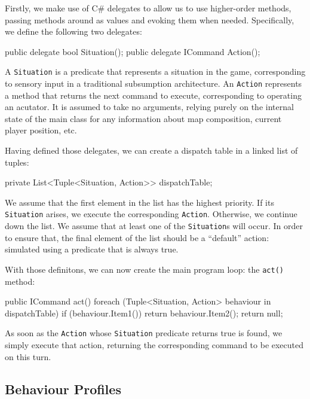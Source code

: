 \documentclass[11pt]{article}
\begin{document}
Firstly, we make use of C\# delegates to allow us to use higher-order methods, passing methods around as values and evoking them when needed. Specifically, we define the following two delegates:

\begin{code}
public delegate bool Situation();
public delegate ICommand Action();
\end{code}

A \verb|Situation| is a predicate that represents a situation in the game, corresponding to sensory input in a traditional subsumption architecture. An \verb|Action| represents a method that returns the next command to execute, corresponding to operating an acutator. It is assumed to take no arguments, relying purely on the internal state of the main class for any information about map composition, current player position, etc.

Having defined those delegates, we can create a dispatch table in a linked list of tuples:

\begin{code}
private List<Tuple<Situation, Action>> dispatchTable;
\end{code}

We assume that the first element in the list has the highest priority. If its \verb|Situation| arises, we execute the corresponding \verb|Action|. Otherwise, we continue down the list. We assume that at least one of the \verb|Situation|s will occur. In order to ensure that, the final element of the list should be a ``default'' action: simulated using a predicate that is always true.

With those definitons, we can now create the main program loop: the \verb|act()| method:

\begin{code}
public ICommand act()
{
  foreach (Tuple<Situation, Action> behaviour in dispatchTable)
  {
    if (behaviour.Item1())
    {
      return behaviour.Item2();
    }
  }
  return null;
}
\end{code}

As soon as the \verb|Action| whose \verb|Situation| predicate returns true is found, we simply execute that action, returning the corresponding command to be executed on this turn.

\subsection{Behaviour Profiles} \label{sec:behaviourProfiles}
\end{document}
